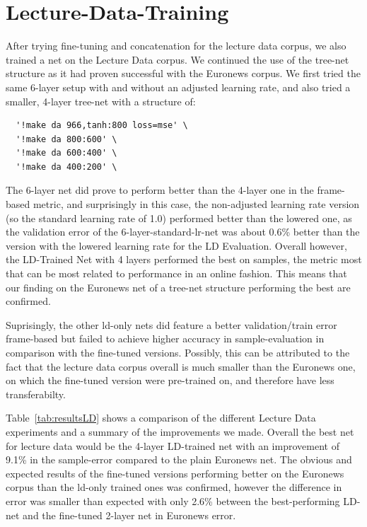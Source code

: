 \section{Lecture-Data-Training}
\label{sec:LIDNetworkLDTraining}

After trying fine-tuning and concatenation for the lecture data corpus, we also trained a net on the Lecture Data corpus. We continued the use of the tree-net structure as it had proven successful with the Euronews corpus.  We first tried the same 6-layer setup with and without an adjusted learning rate, and also tried a smaller, 4-layer tree-net with a structure of:
\begin{verbatim}
  '!make da 966,tanh:800 loss=mse' \
  '!make da 800:600' \
  '!make da 600:400' \
  '!make da 400:200' \
\end{verbatim}

The 6-layer net did prove to perform better than the 4-layer one in the frame-based metric, and surprisingly in this case, the non-adjusted learning rate version (so the standard learning rate of 1.0) performed better than the lowered one, as the validation error of the 6-layer-standard-lr-net was about 0.6\% better than the version with the lowered learning rate for the LD Evaluation.  Overall however, the LD-Trained Net with 4 layers performed the best on samples, the metric most that can be most related to performance in an online fashion. This means that our finding on the Euronews net of a tree-net structure performing the best are confirmed.

Suprisingly, the other ld-only nets did feature a better validation/train error frame-based but failed to achieve higher accuracy in sample-evaluation in comparison with the fine-tuned versions. Possibly, this can be attributed to the fact that the lecture data corpus overall is much smaller than the Euronews one, on which the fine-tuned version were pre-trained on, and therefore have less transferabilty.

Table~\ref{tab:resultsLD} shows a comparison of the different Lecture Data experiments and a summary of the improvements we made. Overall the best net for lecture data would be the 4-layer LD-trained net with an improvement of 9.1\% in the sample-error compared to the plain Euronews net. The obvious and expected results of the fine-tuned versions performing better on the Euronews corpus than the ld-only trained ones was confirmed, however the difference in error was smaller than expected with only 2.6\% between the best-performing LD-net and the fine-tuned 2-layer net in Euronews error.

